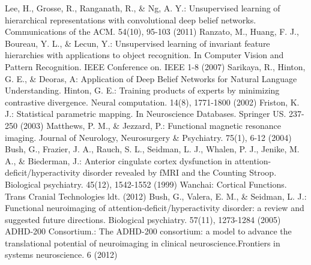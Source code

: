 \documentclass{llncs}
\begin{document}
\begin{thebibliography}{}
Lee, H., Grosse, R., Ranganath, R., \& Ng, A. Y.: Unsupervised learning of hierarchical representations with convolutional deep belief networks. Communications of the ACM. 54(10), 95-103 (2011) 
Ranzato, M., Huang, F. J., Boureau, Y. L., \& Lecun, Y.: Unsupervised learning of invariant feature hierarchies with applications to object recognition. In Computer Vision and Pattern Recognition. IEEE Conference on. IEEE 1-8 (2007)
Sarikaya, R., Hinton, G. E., \& Deoras, A: Application of Deep Belief Networks for Natural Language Understanding. 
Hinton, G. E.: Training products of experts by minimizing contrastive divergence. Neural computation. 14(8), 1771-1800 (2002)
Friston, K. J.: Statistical parametric mapping. In Neuroscience Databases. Springer US. 237-250 (2003)
Matthews, P. M., \& Jezzard, P.: Functional magnetic resonance imaging. Journal of Neurology, Neurosurgery \& Psychiatry. 75(1), 6-12 (2004)
Bush, G., Frazier, J. A., Rauch, S. L., Seidman, L. J., Whalen, P. J., Jenike, M. A., \& Biederman, J.: Anterior cingulate cortex dysfunction in attention-deficit/hyperactivity disorder revealed by fMRI and the Counting Stroop. Biological psychiatry. 45(12), 1542-1552 (1999)
Wanchai: Cortical Functions. Trans Cranial Technologies ldt. (2012)
Bush, G., Valera, E. M., \& Seidman, L. J.: Functional neuroimaging of attention-deficit/hyperactivity disorder: a review and suggested future directions. Biological psychiatry. 57(11), 1273-1284 (2005) 
ADHD-200 Consortium.: The ADHD-200 consortium: a model to advance the translational potential of neuroimaging in clinical neuroscience.Frontiers in systems neuroscience. 6 (2012)

\end{thebibliography}
\end{document}
